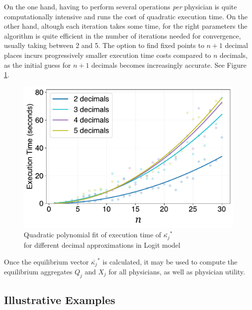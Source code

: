 \documentclass[../main.tex]{subfiles}
\begin{document}
On the one hand, having to perform several operations \textit{per} physician is quite computationally intensive and runs the cost of quadratic execution time. On the other hand, altough each iteration takes some time, for the right parameters the algorithm is quite efficient in the number of iterations needed for convergence, usually taking between 2 and 5. The option to find fixed points to \( n + 1 \) decimal places incurs progressively smaller execution time costs compared to \( n \) decimals, as the initial guess for \( n + 1 \) decimals becomes increasingly accurate. See Figure \ref{fig:decimals}.

\begin{figure}[H]
\centering
\includegraphics[width=0.55\linewidth]{decimals.pdf}
\vspace{-0.25cm}
\captionsetup{justification=centerlast}
\caption{Quadratic polynomial fit of execution time of $\bar{\kappa_j}^*$ \\ for different decimal approximations in Logit model}
\label{fig:decimals}
\end{figure}

Once the equilibrium vector $\bar{\kappa_j}^*$ is calculated, it may be used to compute the equilibrium aggregates $Q_j$ and $X_j$ for all physicians, as well as physician utility.

\subsection{Illustrative Examples}
\end{document}
